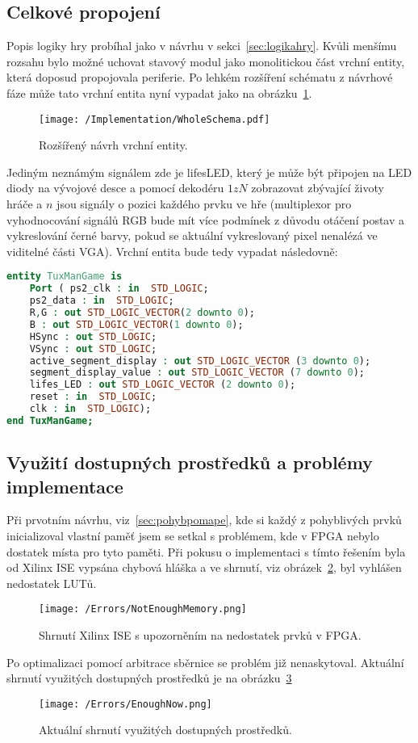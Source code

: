 \documentclass{report}
\begin{document}
\subsection{Celkové propojení}
Popis logiky hry probíhal jako v návrhu v sekci~\ref{sec:logikahry}. Kvůli menšímu rozsahu bylo možné uchovat stavový modul jako monolitickou část vrchní entity, která doposud propojovala periferie. Po lehkém rozšíření schématu z návrhové fáze může tato vrchní entita nyní vypadat jako na obrázku~\ref{fig:wholetoplevel}.
\begin{figure}
\centering
\texttt{[image: /Implementation/WholeSchema.pdf]}
\caption{Rozšířený návrh vrchní entity.}
\label{fig:wholetoplevel}
\end{figure} 
Jediným neznámým signálem zde je lifes\textunderscore LED, který je může být připojen na LED diody na vývojové desce a pomocí dekodéru $1 z N$ zobrazovat zbývající životy hráče a $n$ jsou signály o pozici každého prvku ve hře (multiplexor pro vyhodnocování signálů RGB bude mít více podmínek z důvodu otáčení postav a vykreslování černé barvy, pokud se aktuální vykreslovaný pixel nenalézá ve viditelné části VGA). Vrchní entita bude tedy vypadat následovně:
\begin{lstlisting}[language=VHDL]
entity TuxManGame is
    Port ( ps2_clk : in  STD_LOGIC;
	ps2_data : in  STD_LOGIC;
	R,G : out STD_LOGIC_VECTOR(2 downto 0);
	B : out STD_LOGIC_VECTOR(1 downto 0);
	HSync : out STD_LOGIC;
	VSync : out STD_LOGIC;
	active_segment_display : out STD_LOGIC_VECTOR (3 downto 0);
	segment_display_value : out STD_LOGIC_VECTOR (7 downto 0);
	lifes_LED : out STD_LOGIC_VECTOR (2 downto 0);
	reset : in  STD_LOGIC;
	clk : in  STD_LOGIC);
end TuxManGame;
\end{lstlisting}
\subsection{Využití dostupných prostředků a problémy implementace}\label{sec:implementproblems}
Při prvotním návrhu, viz~\ref{sec:pohybpomape}, kde si každý z pohyblivých prvků inicializoval vlastní paměť jsem se setkal s problémem, kde v FPGA nebylo dostatek místa pro tyto paměti. Při pokusu o implementaci s tímto řešením byla od Xilinx ISE vypsána chybová hláška a ve shrnutí, viz obrázek~\ref{fig:error}, byl vyhlášen nedostatek LUTů. 
\begin{figure}
\centering
\texttt{[image: /Errors/NotEnoughMemory.png]}
\caption{Shrnutí Xilinx ISE s upozorněním na nedostatek prvků v FPGA.}
\label{fig:error}
\end{figure} 
Po optimalizaci pomocí arbitrace sběrnice se problém již nenaskytoval. Aktuální shrnutí využitých dostupných prostředků je na obrázku~\ref{fig:usage}
\begin{figure}
\centering
\texttt{[image: /Errors/EnoughNow.png]}
\caption{Aktuální shrnutí využitých dostupných prostředků.}
\label{fig:usage}
\end{figure} 
\end{document}
